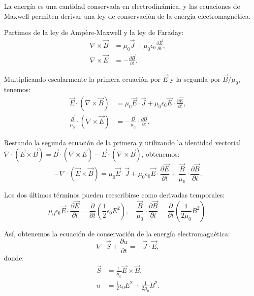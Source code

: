 \documentclass[12pt,a4paper]{book}
\begin{document}
La energía es una cantidad conservada en electrodinámica, y las ecuaciones de Maxwell permiten derivar una ley de conservación de la energía electromagnética.

Partimos de la ley de Ampère-Maxwell y la ley de Faraday:
\begin{align}
\nabla \times \vec{B} &= \mu_0 \vec{J} + \mu_0 \epsilon_0 \frac{\partial \vec{E}}{\partial t}, \\
\nabla \times \vec{E} &= -\frac{\partial \vec{B}}{\partial t}.
\end{align}

Multiplicando escalarmente la primera ecuación por $\vec{E}$ y la segunda por $\vec{B}/\mu_0$, tenemos:
\begin{align}
\vec{E} \cdot (\nabla \times \vec{B}) &= \mu_0 \vec{E} \cdot \vec{J} + \mu_0 \epsilon_0 \vec{E} \cdot \frac{\partial \vec{E}}{\partial t}, \\
\frac{\vec{B}}{\mu_0} \cdot (\nabla \times \vec{E}) &= -\frac{\vec{B}}{\mu_0} \cdot \frac{\partial \vec{B}}{\partial t}.
\end{align}

Restando la segunda ecuación de la primera y utilizando la identidad vectorial $\nabla \cdot (\vec{E} \times \vec{B}) = \vec{B} \cdot (\nabla \times \vec{E}) - \vec{E} \cdot (\nabla \times \vec{B})$, obtenemos:
\begin{equation}
-\nabla \cdot (\vec{E} \times \vec{B}) = \mu_0 \vec{E} \cdot \vec{J} + \mu_0 \epsilon_0 \vec{E} \cdot \frac{\partial \vec{E}}{\partial t} + \frac{\vec{B}}{\mu_0} \cdot \frac{\partial \vec{B}}{\partial t}.
\end{equation}

Los dos últimos términos pueden reescribirse como derivadas temporales:
\begin{equation}
\mu_0 \epsilon_0 \vec{E} \cdot \frac{\partial \vec{E}}{\partial t} = \frac{\partial}{\partial t}\left(\frac{1}{2}\epsilon_0 E^2\right), \quad \frac{\vec{B}}{\mu_0} \cdot \frac{\partial \vec{B}}{\partial t} = \frac{\partial}{\partial t}\left(\frac{1}{2\mu_0}B^2\right).
\end{equation}

Así, obtenemos la ecuación de conservación de la energía electromagnética:
\begin{equation}
\nabla \cdot \vec{S} + \frac{\partial u}{\partial t} = -\vec{J} \cdot \vec{E},
\end{equation}
donde:
\begin{align}
\vec{S} &= \frac{1}{\mu_0}\vec{E} \times \vec{B}, \\
u &= \frac{1}{2}\epsilon_0 E^2 + \frac{1}{2\mu_0}B^2.
\end{align}
\end{document}
